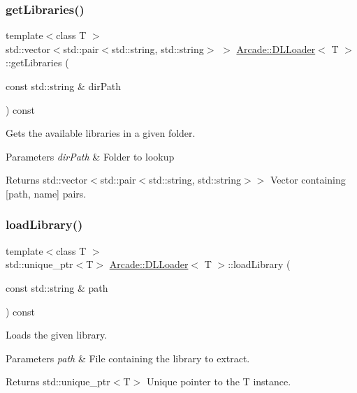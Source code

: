 \subsubsection{\texorpdfstring{getLibraries()}{getLibraries()}}
{\footnotesize\ttfamily template$<$class T $>$ \\
std\+::vector$<$std\+::pair$<$std\+::string, std\+::string$>$ $>$ \mbox{\hyperlink{classArcade_1_1DLLoader}{Arcade\+::\+D\+L\+Loader}}$<$ T $>$\+::get\+Libraries (\begin{DoxyParamCaption}\item[{const std\+::string \&}]{dir\+Path }\end{DoxyParamCaption}) const}



Gets the available libraries in a given folder. 


\begin{DoxyParams}{Parameters}
{\em dir\+Path} & Folder to lookup \\
\hline
\end{DoxyParams}
\begin{DoxyReturn}{Returns}
std\+::vector$<$std\+::pair$<$std\+::string, std\+::string$>$$>$ Vector containing \mbox{[}path, name\mbox{]} pairs. 
\end{DoxyReturn}
\mbox{\label{classArcade_1_1DLLoader_ad9fb1241a01190637402f3866c695272}} 
\subsubsection{\texorpdfstring{loadLibrary()}{loadLibrary()}}
{\footnotesize\ttfamily template$<$class T $>$ \\
std\+::unique\+\_\+ptr$<$T$>$ \mbox{\hyperlink{classArcade_1_1DLLoader}{Arcade\+::\+D\+L\+Loader}}$<$ T $>$\+::load\+Library (\begin{DoxyParamCaption}\item[{const std\+::string \&}]{path }\end{DoxyParamCaption}) const}



Loads the given library. 


\begin{DoxyParams}{Parameters}
{\em path} & File containing the library to extract. \\
\hline
\end{DoxyParams}
\begin{DoxyReturn}{Returns}
std\+::unique\+\_\+ptr$<$\+T$>$ Unique pointer to the T instance. 
\end{DoxyReturn}

